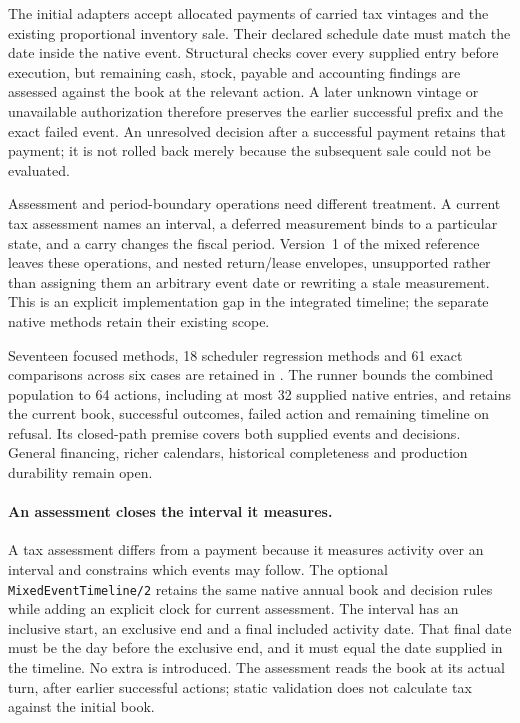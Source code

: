 The initial adapters accept allocated payments of carried tax vintages and the
existing proportional inventory sale. Their declared schedule date must match
the date inside the native event. Structural checks cover every supplied entry
before execution, but remaining cash, stock, payable and accounting findings
are assessed against the book at the relevant action. A later unknown vintage
or unavailable authorization therefore preserves the earlier successful prefix
and the exact failed event. An unresolved decision after a successful payment
retains that payment; it is not rolled back merely because the subsequent sale
could not be evaluated.

Assessment and period-boundary operations need different treatment. A current
tax assessment names an interval, a deferred measurement binds to a particular
state, and a carry changes the fiscal period. Version~1 of the mixed reference leaves these
operations, and nested return/lease envelopes, unsupported rather than assigning
them an arbitrary event date or rewriting a stale measurement. This is an
explicit implementation gap in the integrated timeline; the separate native
methods retain their existing scope.

Seventeen focused methods, 18 scheduler regression methods and 61 exact
comparisons across six cases are retained in
. The runner bounds
the combined population to 64 actions, including at most 32 supplied native
entries, and retains the current book, successful outcomes, failed action and
remaining timeline on refusal. Its closed-path premise covers both supplied
events and decisions. General financing, richer calendars, historical
completeness and production durability remain open.


\paragraph{An assessment closes the interval it measures.}
A tax assessment differs from a payment because it measures activity over an
interval and constrains which events may follow. The optional
\texttt{MixedEventTimeline/2} retains the same native annual book and decision
rules while adding an explicit clock for current assessment. The interval
has an inclusive start, an exclusive end and a final included activity date.
That final date must be the day before the exclusive end, and it must equal
the date supplied in the timeline. No extra  is introduced.
The assessment reads the book at its actual turn, after earlier successful
actions; static validation does not calculate tax against the initial book.

